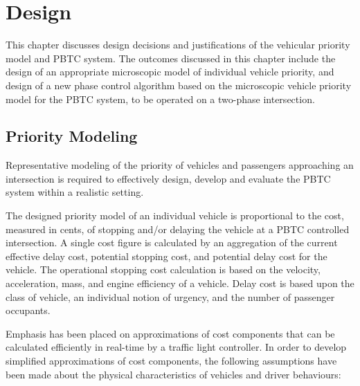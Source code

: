 \chapter{Design}
\label{chapter:design}

This chapter discusses design decisions and justifications of the vehicular priority model and PBTC system. The outcomes discussed in this chapter include the design of an appropriate microscopic model of individual vehicle priority, and design of a new phase control algorithm based on the microscopic vehicle priority model for the PBTC system, to be operated on a two-phase intersection. 

\section{Priority Modeling}

Representative modeling of the priority of vehicles and passengers approaching an intersection is required to effectively design, develop and evaluate the PBTC system within a realistic setting. 

The designed priority model of an individual vehicle is proportional to the cost, measured in cents, of stopping and/or delaying the vehicle at a PBTC controlled intersection. A single cost figure is calculated by an aggregation of the current effective delay cost, potential stopping cost, and potential delay cost for the vehicle. The operational stopping cost calculation is based on the velocity, acceleration, mass, and engine efficiency of a vehicle. Delay cost is based upon the class of vehicle, an individual notion of urgency, and the number of passenger occupants.

Emphasis has been placed on approximations of cost components that can be calculated efficiently in real-time by a traffic light controller. In order to develop simplified approximations of cost components, the following assumptions have been made about the physical characteristics of vehicles and driver behaviours:

